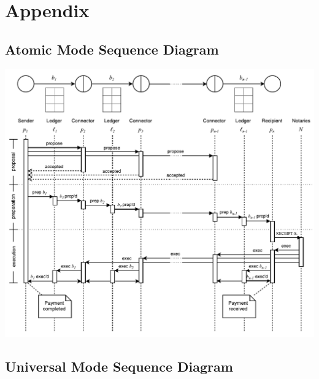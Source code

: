\documentclass[letterpaper,twocolumn,10pt]{article}
\begin{document}
{\footnotesize 
}

\clearpage
\appendix
\section{Appendix}

\subsection{Atomic Mode Sequence Diagram}
\label{sec:atomic-sequence}


\begin{minipage}{\textwidth}
    \centering
    \includegraphics[width=\textwidth]{figures/atomic-sequence.pdf}
\end{minipage}

\clearpage

\subsection{Universal Mode Sequence Diagram}
\label{sec:universal-sequence}
\end{document}
